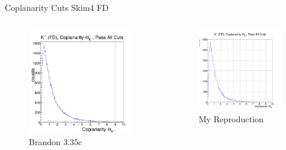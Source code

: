 \documentclass[aspectratio=169]{beamer}
\begin{document}
\begin{frame}{Coplanarity Cuts \hfill Skim4 FD}
\vspace*{-0.6cm}
    \begin{columns}
    \begin{figure}
        \centering
        \includegraphics[width=0.94\textwidth]{brandon_figs/35c.png}
        \caption{Brandon 3.35c}
    \end{figure}
    \begin{figure}
        \centering
        \includegraphics[width=0.97\textwidth]{pdfs/35c.png}
        \caption{My Reproduction}
    \end{figure}
    \end{columns}
\end{frame}
\end{document}
